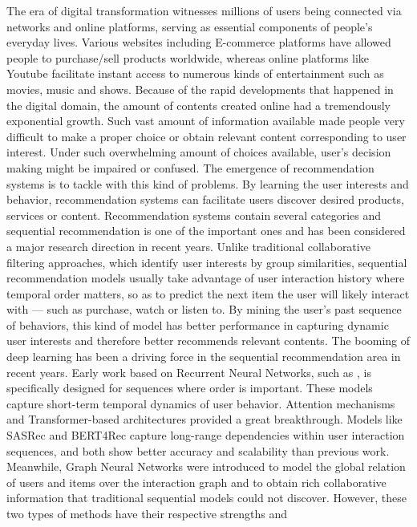 \documentclass[12pt,a4paper]{report}
\begin{document}
The era of digital transformation witnesses millions of users being connected
via networks and online platforms, serving as essential components of people's
everyday lives. Various websites including E-commerce platforms have allowed
people to purchase/sell products worldwide, whereas online platforms like
Youtube facilitate instant access to numerous kinds of entertainment such as
movies, music and shows.
Because of the rapid developments that happened in the digital domain, the
amount of contents created online had a tremendously exponential growth. Such
vast amount of information available made people very difficult to make a
proper choice or obtain relevant content corresponding to user interest. Under
such overwhelming amount of choices available, user's decision making might be
impaired or confused.
The emergence of recommendation systems is to tackle with this kind of
problems. By learning the user interests and behavior, recommendation systems
can facilitate users discover desired products, services or content.
Recommendation systems contain several categories and sequential recommendation
is one of the important ones and has been considered a major research direction
in recent years. Unlike traditional collaborative filtering approaches, which
identify user interests by group similarities, sequential recommendation models
usually take advantage of user interaction history where temporal order matters,
so as to predict the next item the user will likely interact with --- such as
purchase, watch or listen to. By mining the user's past sequence of behaviors,
this kind of model has better performance in capturing dynamic user interests
and therefore better recommends relevant contents.
The booming of deep learning has been a driving force in the sequential
recommendation area in recent years. Early work based on Recurrent Neural
Networks, such as \citet{hidasi2016gru4rec}, is specifically designed for
sequences where order is important. These models capture short-term temporal
dynamics of user behavior.
Attention mechanisms and Transformer-based architectures provided a great
breakthrough. Models like SASRec \citep{kang2018sasrec} and BERT4Rec
\citep{sun2019bert4rec} capture long-range dependencies within user interaction
sequences, and both show better accuracy and scalability than previous work.
Meanwhile, Graph Neural Networks were introduced to model the global relation
of users and items over the interaction graph and to obtain rich collaborative
information that traditional sequential models could not discover.
However, these two types of methods have their respective strengths and
\end{document}
